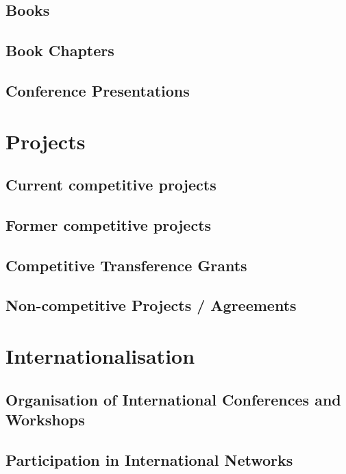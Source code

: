 \documentclass[english,a4paper,12pt,titlepage]{report}
\begin{document}
  \section{Books}
  	
  \section{Book Chapters}
  	
  \section{Conference Presentations}
  	
  
  \chapter{Projects}
  \section{Current competitive projects}
    
  \section{Former competitive projects}
    
  \section{Competitive Transference Grants}
      

  \section{Non-competitive Projects / Agreements}
    

  \chapter{Internationalisation}

  \section{Organisation of International Conferences and Workshops}
    
  \section{Participation in International Networks}
    
\end{document}
